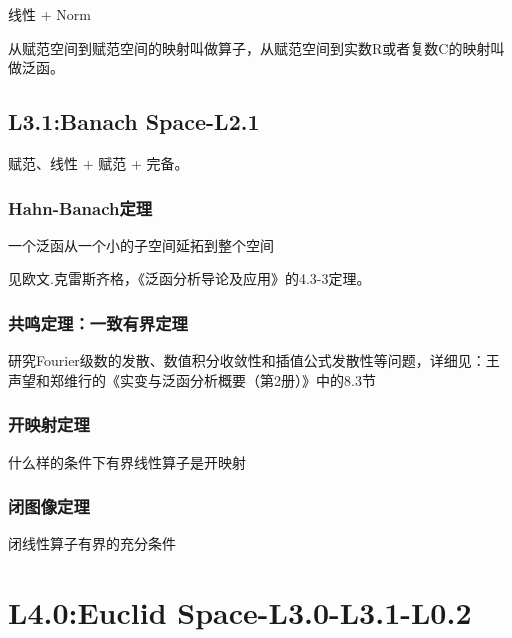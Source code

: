 \documentclass[UTF8]{../../09-Mathematics}
\begin{document}
线性 + Norm


从赋范空间到赋范空间的映射叫做算子，从赋范空间到实数R或者复数C的映射叫做泛函。


\section{L3.1:Banach Space-L2.1}

赋范、线性 + 赋范 + 完备。



\subsection{Hahn-Banach定理}
一个泛函从一个小的子空间延拓到整个空间

见欧文.克雷斯齐格，《泛函分析导论及应用》的4.3-3定理。

\subsection{共鸣定理：一致有界定理}

研究Fourier级数的发散、数值积分收敛性和插值公式发散性等问题，详细见：王声望和郑维行的《实变与泛函分析概要（第2册）》中的8.3节


\subsection{开映射定理}

什么样的条件下有界线性算子是开映射

\subsection{闭图像定理}

闭线性算子有界的充分条件

\chapter{L4.0:Euclid Space-L3.0-L3.1-L0.2}
\end{document}
